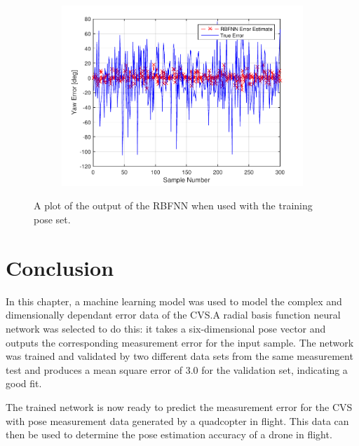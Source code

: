 \begin{figure}
\begin{subfigure}{0.3\textwidth}
    \caption{}
  \end{subfigure}
~
  \begin{subfigure}{0.3\textwidth}
    \includegraphics[width=\textwidth]{figures/chapter4/yaw_valid}
    \caption{}
  \end{subfigure}
  \caption{A plot of the output of the RBFNN when used with the training pose set.}
  \label{fig:chap4-rbf-train}
\end{figure}

\section{Conclusion}

In this chapter, a machine learning model was used to model the complex and dimensionally dependant error data of the CVS.\@ A radial basis function neural network was selected to do this: it takes a six-dimensional pose vector and outputs the corresponding measurement error for the input sample. The network was trained and validated by two different data sets from the same measurement test and produces a mean square error of 3.0 for the validation set, indicating a good fit. 

The trained network is now ready to predict the measurement error for the CVS with pose measurement data generated by a quadcopter in flight. This data can then be used to determine the pose estimation accuracy of a drone in flight. 

